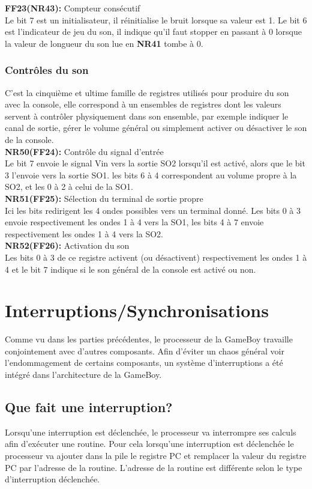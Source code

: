 \documentclass{report}
\begin{document}
		\textbf{FF23(NR43):} Compteur consécutif\\
		Le bit 7 est un initialisateur, il réinitialise le bruit
		lorsque sa valeur est 1.
		Le bit 6 est l'indicateur de jeu du son, il indique
		qu'il faut stopper en passant à 0 lorsque la valeur de
		longueur du son lue en \textbf{NR41} tombe à 0. 
	\subsubsection{Contrôles du son}
		C'est la cinquième et ultime famille de registres
		utilisés pour produire du son avec la console, elle
		correspond à un ensembles de registres dont les
		valeurs servent à contrôler physiquement dans son
		ensemble, par exemple indiquer le canal de sortie,
		gérer le volume général ou simplement activer ou
		désactiver le son de la console. \\

		\textbf{NR50(FF24):} Contrôle du signal d'entrée \\ 
		Le bit 7 envoie le signal Vin vers la sortie SO2
		lorsqu'il est activé, alors que le bit 3 l'envoie vers
		la sortie SO1. les bits 6 à 4 correspondent au volume
		propre à la SO2, et les 0 à 2 à celui de la SO1. \\

		\textbf{NR51(FF25):} Sélection du terminal de sortie propre \\
		Ici les bits redirigent les 4 ondes possibles vers un
		terminal donné.
		Les bits 0 à 3 envoie respectivement les ondes 1 à 4
		vers la SO1, les bits 4 à 7 envoie respectivement les
		ondes 1 à 4 vers la SO2.\\

		\textbf{NR52(FF26):} Activation du son \\
		Les bits 0 à 3 de ce registre activent (ou
		désactivent) respectivement les ondes 1 à 4 et le bit
		7 indique si le son général de la console est activé
		ou non.
\section{Interruptions/Synchronisations}
Comme vu dans les parties précédentes, le processeur de la GameBoy travaille conjointement avec d'autres composants. Afin d'éviter un chaos général voir l'endommagement de certains composants, un système d'interruptions a été intégré dans l'architecture de la GameBoy.
\subsection{Que fait une interruption?}
Lorsqu'une interruption est déclenchée, le processeur va interrompre ses calculs afin d'exécuter une routine. Pour cela lorsqu'une interruption est déclenchée le processeur va ajouter dans la pile le registre PC et remplacer la valeur du registre PC par l'adresse de la routine. L'adresse de la routine est différente selon le type d'interruption déclenchée.
\end{document}
